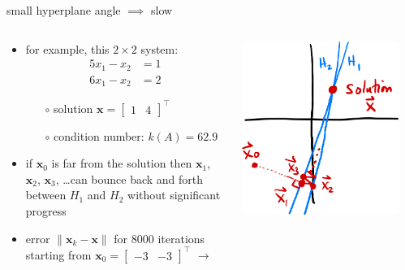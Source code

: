\documentclass[usepdftitle=false,usenames,dvipsnames]{beamer}
\newcommand{\bx}{\mathbf{x}}
\begin{document}
\begin{frame}{small hyperplane angle $\implies$ slow}

\begin{columns}
\begin{column}{0.6\textwidth}
\begin{itemize}
\item for example, this $2\times 2$ system:
\begin{align*}
5 x_1 - x_2 &= 1 \\
6 x_1 - x_2 &= 2
\end{align*}

    \begin{itemize}
    \item[$\circ$] solution $\bx = \begin{bmatrix} 1 & 4 \end{bmatrix}^\top$
    \item[$\circ$] condition number: $k(A) = 62.9$
    \end{itemize}
\item if $\bx_0$ is far from the solution then $\bx_1$, $\bx_2$,  $\bx_3$, \dots can bounce back and forth between $H_1$ and $H_2$ without significant progress
\item error $\|\bx_k - \bx\|$ for 8000 iterations starting from $\bx_0 = \begin{bmatrix} -3 & -3 \end{bmatrix}^\top$ \hfill $\to$
\end{itemize}
\end{column}
\begin{column}{0.4\textwidth}
\hfill \includegraphics[width=0.9\textwidth]{figs/bad2.png}


\end{column}
\end{columns}
\end{frame}
\end{document}
